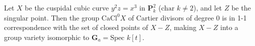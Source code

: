 Let $X$ be the cuspidal cubic curve $y^2z = x^3$ in $\mathbf{P}_k^2$ ($\text{char } k \neq 2$), and let $Z$ be the singular point. Then the group $\text{CaCl}^0 X$ of Cartier divisors of degree 0 is in 1-1 correspondence with the set of closed points of $X - Z$, making $X - Z$ into a group variety isomorphic to $\mathbf{G}_a = \text{Spec } k[t]$.
